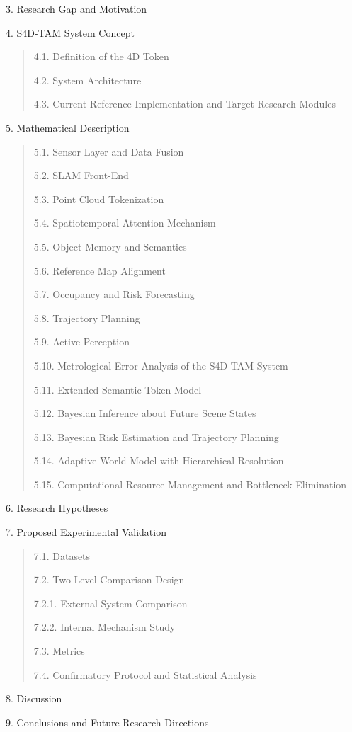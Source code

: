 \documentclass[
]{article}
\begin{document}
3. Research Gap and Motivation

4. S4D-TAM System Concept

\begin{quote}
4.1. Definition of the 4D Token

4.2. System Architecture

4.3. Current Reference Implementation and Target Research Modules
\end{quote}

5. Mathematical Description

\begin{quote}
5.1. Sensor Layer and Data Fusion

5.2. SLAM Front-End

5.3. Point Cloud Tokenization

5.4. Spatiotemporal Attention Mechanism

5.5. Object Memory and Semantics

5.6. Reference Map Alignment

5.7. Occupancy and Risk Forecasting

5.8. Trajectory Planning

5.9. Active Perception

5.10. Metrological Error Analysis of the S4D-TAM System

5.11. Extended Semantic Token Model

5.12. Bayesian Inference about Future Scene States

5.13. Bayesian Risk Estimation and Trajectory Planning

5.14. Adaptive World Model with Hierarchical Resolution

5.15. Computational Resource Management and Bottleneck Elimination
\end{quote}

6. Research Hypotheses

7. Proposed Experimental Validation

\begin{quote}
7.1. Datasets

7.2. Two-Level Comparison Design

7.2.1. External System Comparison

7.2.2. Internal Mechanism Study

7.3. Metrics

7.4. Confirmatory Protocol and Statistical Analysis
\end{quote}

8. Discussion

9. Conclusions and Future Research Directions
\end{document}
